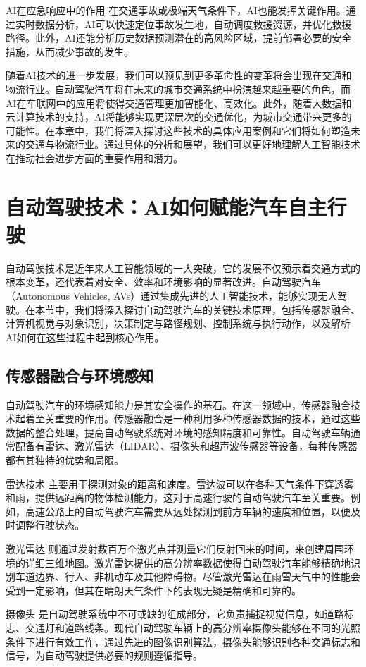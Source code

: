 AI在应急响应中的作用
在交通事故或极端天气条件下，AI也能发挥关键作用。通过实时数据分析，AI可以快速定位事故发生地，自动调度救援资源，并优化救援路径。此外，AI还能分析历史数据预测潜在的高风险区域，提前部署必要的安全措施，从而减少事故的发生。

随着AI技术的进一步发展，我们可以预见到更多革命性的变革将会出现在交通和物流行业。自动驾驶汽车将在未来的城市交通系统中扮演越来越重要的角色，而AI在车联网中的应用将使得交通管理更加智能化、高效化。此外，随着大数据和云计算技术的支持，AI将能够实现更深层次的交通优化，为城市交通带来更多的可能性。在本章中，我们将深入探讨这些技术的具体应用案例和它们将如何塑造未来的交通与物流行业。通过具体的分析和展望，我们可以更好地理解人工智能技术在推动社会进步方面的重要作用和潜力。

\section{自动驾驶技术：AI如何赋能汽车自主行驶}
自动驾驶技术是近年来人工智能领域的一大突破，它的发展不仅预示着交通方式的根本变革，还代表着对安全、效率和环境影响的显著改进。自动驾驶汽车（Autonomous Vehicles, AVs）通过集成先进的人工智能技术，能够实现无人驾驶。在本节中，我们将深入探讨自动驾驶汽车的关键技术原理，包括传感器融合、计算机视觉与对象识别，决策制定与路径规划、控制系统与执行动作，以及解析AI如何在这些过程中起到核心作用。
\subsection{传感器融合与环境感知} 
自动驾驶汽车的环境感知能力是其安全操作的基石。在这一领域中，传感器融合技术起着至关重要的作用。传感器融合是一种利用多种传感器数据的技术，通过这些数据的整合处理，提高自动驾驶系统对环境的感知精度和可靠性。自动驾驶车辆通常配备有雷达、激光雷达（LIDAR）、摄像头和超声波传感器等设备，每种传感器都有其独特的优势和局限。

雷达技术 主要用于探测对象的距离和速度。雷达波可以在各种天气条件下穿透雾和雨，提供远距离的物体检测能力，这对于高速行驶的自动驾驶汽车至关重要。例如，高速公路上的自动驾驶汽车需要从远处探测到前方车辆的速度和位置，以便及时调整行驶状态。

激光雷达 则通过发射数百万个激光点并测量它们反射回来的时间，来创建周围环境的详细三维地图。激光雷达提供的高分辨率数据使得自动驾驶汽车能够精确地识别车道边界、行人、非机动车及其他障碍物。尽管激光雷达在雨雪天气中的性能会受到一定影响，但其在晴朗天气条件下的表现无疑是精确和可靠的。

摄像头 是自动驾驶系统中不可或缺的组成部分，它负责捕捉视觉信息，如道路标志、交通灯和道路线条。现代自动驾驶车辆上的高分辨率摄像头能够在不同的光照条件下进行有效工作，通过先进的图像识别算法，摄像头能够识别各种交通标志和信号，为自动驾驶提供必要的规则遵循指导。

